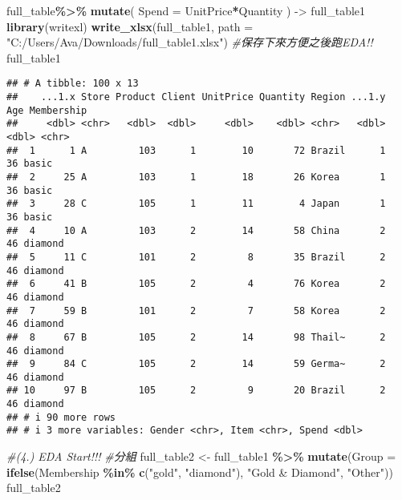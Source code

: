 \documentclass[
]{article}
\newenvironment{Shaded}{\begin{snugshade}}{\end{snugshade}}
\newcommand{\AttributeTok}[1]{\textcolor[rgb]{0.13,0.29,0.53}{#1}}
\newcommand{\CommentTok}[1]{\textcolor[rgb]{0.56,0.35,0.01}{\textit{#1}}}
\newcommand{\FunctionTok}[1]{\textcolor[rgb]{0.13,0.29,0.53}{\textbf{#1}}}
\newcommand{\NormalTok}[1]{#1}
\newcommand{\OtherTok}[1]{\textcolor[rgb]{0.56,0.35,0.01}{#1}}
\newcommand{\SpecialCharTok}[1]{\textcolor[rgb]{0.81,0.36,0.00}{\textbf{#1}}}
\newcommand{\StringTok}[1]{\textcolor[rgb]{0.31,0.60,0.02}{#1}}
\begin{document}
\begin{Shaded}
\begin{Highlighting}[]
\NormalTok{full\_table}\SpecialCharTok{\%\textgreater{}\%}
  \FunctionTok{mutate}\NormalTok{( }\AttributeTok{Spend =}\NormalTok{ UnitPrice}\SpecialCharTok{*}\NormalTok{Quantity ) }\OtherTok{{-}\textgreater{}}\NormalTok{ full\_table1}
\FunctionTok{library}\NormalTok{(writexl)}
\FunctionTok{write\_xlsx}\NormalTok{(full\_table1, }\AttributeTok{path =} \StringTok{"C:/Users/Ava/Downloads/full\_table1.xlsx"}\NormalTok{) }\CommentTok{\#保存下來方便之後跑EDA!!}
\NormalTok{full\_table1}
\end{Highlighting}
\end{Shaded}

\begin{verbatim}
## # A tibble: 100 x 13
##    ...1.x Store Product Client UnitPrice Quantity Region ...1.y   Age Membership
##     <dbl> <chr>   <dbl>  <dbl>     <dbl>    <dbl> <chr>   <dbl> <dbl> <chr>     
##  1      1 A         103      1        10       72 Brazil      1    36 basic     
##  2     25 A         103      1        18       26 Korea       1    36 basic     
##  3     28 C         105      1        11        4 Japan       1    36 basic     
##  4     10 A         103      2        14       58 China       2    46 diamond   
##  5     11 C         101      2         8       35 Brazil      2    46 diamond   
##  6     41 B         105      2         4       76 Korea       2    46 diamond   
##  7     59 B         101      2         7       58 Korea       2    46 diamond   
##  8     67 B         105      2        14       98 Thail~      2    46 diamond   
##  9     84 C         105      2        14       59 Germa~      2    46 diamond   
## 10     97 B         105      2         9       20 Brazil      2    46 diamond   
## # i 90 more rows
## # i 3 more variables: Gender <chr>, Item <chr>, Spend <dbl>
\end{verbatim}

\begin{Shaded}
\begin{Highlighting}[]
\CommentTok{\#(4.) EDA Start!!!}
\CommentTok{\#分組}
\NormalTok{full\_table2 }\OtherTok{\textless{}{-}}\NormalTok{ full\_table1 }\SpecialCharTok{\%\textgreater{}\%}
  \FunctionTok{mutate}\NormalTok{(}\AttributeTok{Group =} \FunctionTok{ifelse}\NormalTok{(Membership }\SpecialCharTok{\%in\%} \FunctionTok{c}\NormalTok{(}\StringTok{"gold"}\NormalTok{, }\StringTok{"diamond"}\NormalTok{), }\StringTok{"Gold \& Diamond"}\NormalTok{, }\StringTok{"Other"}\NormalTok{))}
\NormalTok{full\_table2}
\end{Highlighting}
\end{Shaded}
\end{document}
